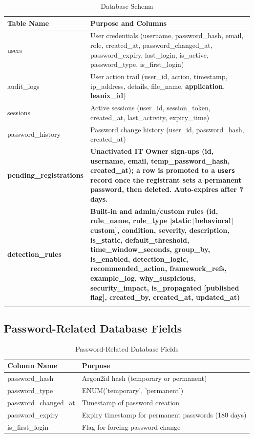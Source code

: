 \documentclass[12pt,a4paper]{article}
\begin{document}
\begin{longtable}{|p{4.2cm}|p{11cm}|}
\hline
\textbf{Table Name} & \textbf{Purpose and Columns} \\
\hline
users & User credentials (username, password\_hash, email, role, created\_at, password\_changed\_at, password\_expiry, last\_login, is\_active, password\_type, is\_first\_login) \\
\hline
audit\_logs & User action trail (user\_id, action, timestamp, ip\_address, details, file\_name, \textbf{application}, \textbf{leanix\_id}) \\
\hline
sessions & Active sessions (user\_id, session\_token, created\_at, last\_activity, expiry\_time) \\
\hline
password\_history & Password change history (user\_id, password\_hash, created\_at) \\
\hline
\textbf{pending\_registrations} & \textbf{Unactivated IT Owner sign-ups (id, username, email, temp\_password\_hash, created\_at); a row is promoted to a \texttt{users} record once the registrant sets a permanent password, then deleted. Auto-expires after 7 days.} \\
\hline
\textbf{detection\_rules} & \textbf{Built-in and admin/custom rules (id, rule\_name,
rule\_type [static\,$\vert$\,behavioral\,$\vert$\,custom], condition, severity, description,
is\_static, default\_threshold, time\_window\_seconds, group\_by, is\_enabled,
detection\_logic, recommended\_action, framework\_refs, example\_log, why\_suspicious,
security\_impact, is\_propagated [published flag], created\_by, created\_at, updated\_at)} \\
\hline
\caption{Database Schema}
\label{tab:schema}
\end{longtable}



\subsection{Password-Related Database Fields}

\begin{table}[H]
\centering
\begin{tabular}{|p{4cm}|p{10cm}|}
\hline
\textbf{Column Name} & \textbf{Purpose} \\
\hline
password\_hash & Argon2id hash (temporary or permanent) \\
\hline
password\_type & ENUM('temporary', 'permanent') \\
\hline
password\_changed\_at & Timestamp of password creation \\
\hline
password\_expiry & Expiry timestamp for permanent passwords (180 days) \\
\hline
is\_first\_login & Flag for forcing password change \\
\hline
\end{tabular}
\caption{Password-Related Database Fields}
\label{tab:password-fields}
\end{table}
\end{document}
